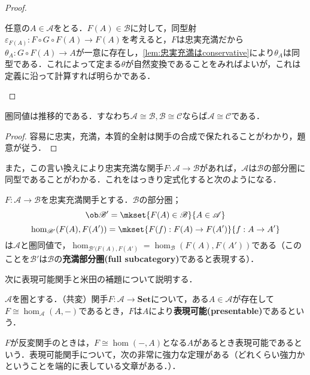\begin{proof}
\begin{eqv}
		任意の$A\in\mathscr{A}$をとる．$F(A)\in\mathscr{B}$に対して，同型射$\varepsilon_{F(A)}:F\circ G\circ F(A)\to F(A)$を考えると，$F$は忠実充満だから$\theta_A:G\circ F(A)\to A$が一意に存在し，\ref{lem:忠実充満はconservative}により$\theta_A$は同型である．これによって定まる$\theta$が自然変換であることをみればよいが，これは定義に沿って計算すれば明らかである．
	\end{eqv}
\end{proof}

\begin{cor}
	圏同値は推移的である．すなわち$\mathscr{A}\cong\mathscr{B},\mathscr{B}\cong\mathscr{C}$ならば$\mathscr{A}\cong\mathscr{C}$である．
\end{cor}

\begin{proof}
	容易に忠実，充満，本質的全射は関手の合成で保たれることがわかり，題意が従う．
\end{proof}

また，この言い換えにより忠実充満な関手$F:\mathscr{A}\to\mathscr{B}$があれば，$\mathscr{A}$は$\mathscr{B}$の部分圏に同型であることがわかる．これをはっきり定式化すると次のようになる．

\begin{cor}
	$F:\mathscr{A}\to\mathscr{B}$を忠実充満関手とする．$\mathscr{B}$の部分圏；
	\[\ob\mathscr{B'}=\mkset{F(A)\in\mathscr{B}}{A\in\mathscr{A}}\]
	\[\hom_{\mathscr{B'}}(F(A),F(A'))=\mkset{F(f):F(A)\to F(A')}{f:A\to A'}\]
	は$\mathscr{A}$と圏同値で，$\hom_{\mathscr{B'}(F(A),F(A')}=\hom_{\mathscr{B}}(F(A),F(A'))$である（このことを$\mathscr{B'}$は$\mathscr{B}$の\textbf{充満部分圏(full subcategory)}であると表現する）．
\end{cor}

次に表現可能関手と米田の補題について説明する．

\begin{defi}[表現可能関手]
	$\mathscr{A}$を圏とする．（共変）関手$F:\mathscr{A}\to\mathbf{Set}$について，ある$A\in\mathscr{A}$が存在して$F\cong\hom_{\mathscr{A}}(A,-)$であるとき，$F$は$A$により\textbf{表現可能(presentable)}であるという．
\end{defi}

$F$が反変関手のときは，$F\cong\hom(-,A)$となる$A$があるとき表現可能であるという．表現可能関手について，次の非常に強力な定理がある（どれくらい強力かということを端的に表している文章がある．）．

